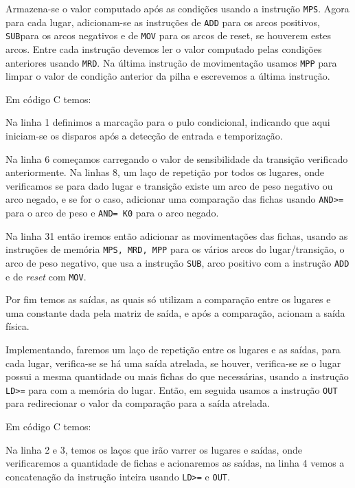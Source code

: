 Armazena-se o valor computado após as condições usando a instrução \lstinline{MPS}. Agora para cada lugar, adicionam-se as instruções de \lstinline{ADD} para os arcos positivos, \lstinline{SUB}para os arcos negativos e de \lstinline{MOV} para os arcos de reset, se houverem estes arcos. Entre cada instrução devemos ler o valor computado pelas condições anteriores usando \lstinline{MRD}. Na última instrução de movimentação usamos \lstinline{MPP} para limpar o valor de condição anterior da pilha e escrevemos a última instrução.

Em código C temos:



Na linha 1 definimos a marcação para o pulo condicional, indicando que aqui iniciam-se os disparos após a detecção de entrada e temporização. 

Na linha 6 começamos carregando o valor de sensibilidade da transição verificado anteriormente. Na linhas 8, um laço de repetição por todos os lugares, onde verificamos se para dado lugar e transição existe um arco de peso negativo ou arco negado, e se for o caso, adicionar uma comparação das fichas usando \lstinline{AND>=} para o arco de peso e \lstinline{AND= K0} para o arco negado.

Na linha 31 então iremos então adicionar as movimentações das fichas, usando as instruções de memória \lstinline{MPS, MRD, MPP} para os vários arcos do lugar/transição, o arco de peso negativo, que usa a instrução \lstinline{SUB}, arco positivo com a instrução \lstinline{ADD} e de \textit{reset} com \lstinline{MOV}. 

Por fim temos as saídas, as quais só utilizam a comparação entre os lugares e uma constante dada pela matriz de saída, e após a comparação, acionam a saída física.



Implementando, faremos um laço de repetição entre os lugares e as saídas, para cada lugar, verifica-se se há uma saída atrelada, se houver, verifica-se se o lugar possui a mesma quantidade ou mais fichas do que necessárias, usando a instrução \lstinline{LD>=} para com a memória do lugar. Então, em seguida usamos a instrução \lstinline{OUT} para redirecionar o valor da comparação para a saída atrelada. 

Em código C temos:



Na linha 2 e 3, temos os laços que irão varrer os lugares e saídas, onde verificaremos a quantidade de fichas e acionaremos as saídas, na linha 4 vemos a concatenação da instrução inteira usando \lstinline{LD>=} e \lstinline{OUT}. 